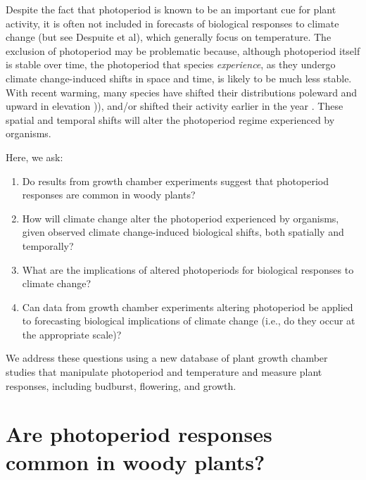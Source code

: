\documentclass{article}
\begin{document}
\par Despite the fact that photoperiod is known to be an important cue for plant activity, it is often not included in forecasts of biological responses to climate change (but see Despuite et al), which generally focus on temperature.
The exclusion of photoperiod may be problematic because, although photoperiod itself is stable over time, the photoperiod that species \emph{experience}, as they undergo climate change-induced shifts in space and time, is likely to be much less stable. With recent warming, many species have shifted their distributions poleward and upward in elevation \citep[i.e., range shifts][]{parmesan2006, chen2011,harsch2009})), and/or shifted their activity earlier in the year \citep[i.e., phenological shifts][]{parmesan2006, wolkovich2012}. These spatial and temporal shifts will alter the photoperiod regime experienced by organisms. 
\par Here, we ask: 
\begin{enumerate}
\item Do results from growth chamber experiments suggest that photoperiod responses are common in woody plants?
\item How will climate change alter the photoperiod experienced by organisms, given observed climate change-induced biological shifts, both spatially and temporally?
\item What are the implications of altered photoperiods for biological responses to climate change?
\item Can data from growth chamber experiments altering photoperiod be applied to forecasting biological implications of climate change (i.e., do they occur at the appropriate scale)?

\end{enumerate}
\par We address these questions using a new database of plant growth chamber studies that manipulate photoperiod and temperature and measure plant responses, including budburst, flowering, and growth. 


\section*{Are photoperiod responses common in woody plants?}
\end{document}
